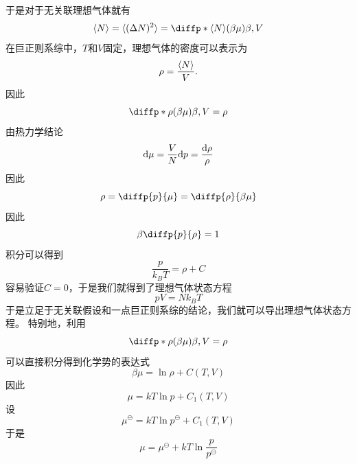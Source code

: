 于是对于无关联理想气体就有\begin{equation}
    \braket{N}=\braket{(\Delta N)^2} =\diffp*{{\braket{N}}}{{(\beta \mu)}}{\beta,V}
\end{equation}
在巨正则系综中，$T$和$V$固定，理想气体的密度可以表示为\begin{equation}
    \rho=\frac{\braket{N}}{V}.
\end{equation}
因此\begin{equation}
    \diffp*{{\rho}}{{(\beta \mu)}}{\beta,V} =\rho
\end{equation}
由热力学结论\begin{equation}
    \mathrm{d} \mu =\frac{V}{N} \mathrm{d} p=\frac{\mathrm{d} \rho}{\rho}
\end{equation}
因此\begin{equation}
    \rho=\diffp{p}{\mu}=\diffp{\rho}{{\beta \mu}}
\end{equation}
因此\begin{equation}
    \beta \diffp{p}{\rho}=1
\end{equation}
积分可以得到\begin{equation}
    \frac{p}{k_B T}=\rho+C
\end{equation}
容易验证$C=0$，于是我们就得到了理想气体状态方程\begin{equation}
    pV=Nk_BT
\end{equation}
于是立足于无关联假设和一点巨正则系综的结论，我们就可以导出理想气体状态方程。
特别地，利用
\begin{equation}
    \diffp*{{\rho}}{{(\beta \mu)}}{\beta,V} =\rho
\end{equation}
可以直接积分得到化学势的表达式\begin{equation}
    \beta \mu =\ln \rho +C(T,V)
\end{equation}
因此\begin{equation}
    \mu=kT\ln p +C_1(T,V)
\end{equation}
设\begin{equation}
    \mu^{\ominus} =kT\ln p^{\ominus} +C_1(T,V)
\end{equation}
于是\begin{equation}
    \mu =\mu^\ominus +kT \ln \frac{p}{p^\ominus}
\end{equation}
